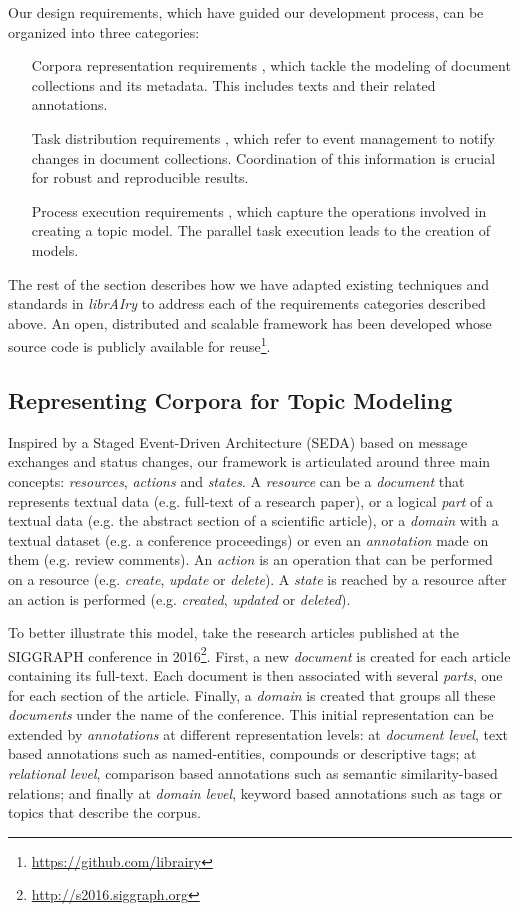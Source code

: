 Our design requirements, which have guided our development process, can be organized into three categories:
\begin{itemize}
\item[Corpora representation requirements], which tackle the modeling of document collections and its metadata. This includes texts and their related annotations.
\item[Task distribution requirements], which refer to event management to notify changes in document collections. Coordination of this information is crucial for robust and reproducible results.  
\item[Process execution requirements], which capture the operations involved in creating a topic model. The parallel task execution leads to the creation of models.
\end{itemize}

The rest of the section describes how we have adapted existing techniques and standards in \textit{librAIry} to address each of the requirements categories described above. An open, distributed and scalable framework has been developed whose source code is publicly available for reuse\footnote{\url{https://github.com/librairy}}.

\subsection{Representing Corpora for Topic Modeling}

Inspired by a Staged Event-Driven Architecture (SEDA) based on message exchanges and status changes, our framework is articulated around three main concepts: \textit{resources}, \textit{actions} and \textit{states}. A \textit{resource} can be a \textit{document} that represents textual data (e.g. full-text of a research paper), or a logical \textit{part} of a textual data (e.g. the abstract section of a scientific article), or a \textit{domain} with a textual dataset (e.g. a conference proceedings) or even an \textit{annotation} made on them (e.g. review comments). An \textit{action} is an operation that can be performed on a resource (e.g. \textit{create}, \textit{update} or \textit{delete}). A \textit{state} is reached by a resource after an action is performed (e.g. \textit{created}, \textit{updated} or \textit{deleted}).  

To better illustrate this model, take the research articles published at the SIGGRAPH conference in 2016\footnote{\url{http://s2016.siggraph.org}}. First, a new \textit{document} is created for each article containing its full-text. Each document is then associated with several \textit{parts}, one for each section of the article. Finally, a \textit{domain} is created that groups all these \textit{documents} under the name of the conference. This initial representation can be extended by \textit{annotations} at different representation levels: at \textit{document level}, text based annotations such as named-entities, compounds or descriptive tags; at \textit{relational level}, comparison based annotations such as semantic similarity-based relations; and finally at \textit{domain level}, keyword based annotations such as tags or topics that describe the corpus.

